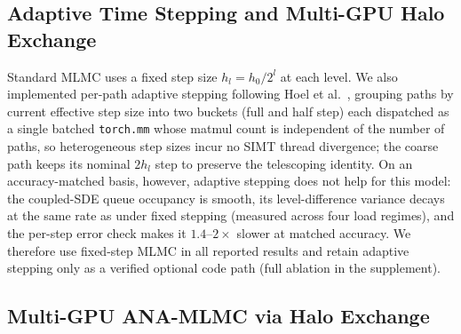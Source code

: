 \documentclass{ieeeaccess}
\begin{document}
\subsection{Adaptive Time Stepping and Multi-GPU Halo Exchange}
\label{subsec:adaptive_multigpu_combined}
Standard MLMC uses a fixed step size $h_l = h_0/2^l$ at each level. We also implemented per-path
adaptive stepping following Hoel et al.~\cite{hoel2014adaptive}, grouping paths by current
effective step size into two buckets (full and half step) each dispatched as a single batched
\texttt{torch.mm} whose matmul count is independent of the number of paths, so heterogeneous
step sizes incur no SIMT thread divergence; the coarse path keeps its nominal $2h_l$ step to
preserve the telescoping identity. On an accuracy-matched basis, however, adaptive stepping does
not help for this model: the coupled-SDE queue occupancy is smooth, its level-difference variance
decays at the same rate as under fixed stepping (measured across four load regimes), and the
per-step error check makes it $1.4$--$2\times$ slower at matched accuracy. We therefore use
fixed-step MLMC in all reported results and retain adaptive stepping only as a verified optional
code path (full ablation in the supplement).

\subsection{Multi-GPU ANA-MLMC via Halo Exchange}
\label{subsec:halo_exchange}
\end{document}
